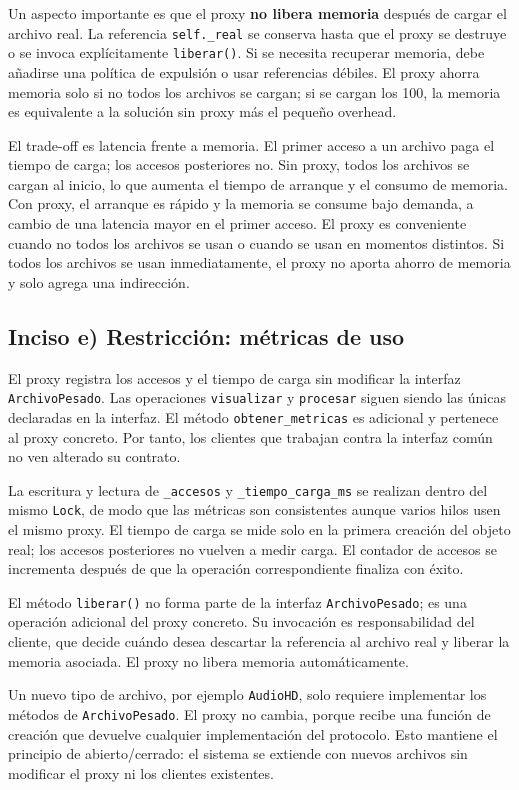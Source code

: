 Un aspecto importante es que el proxy \textbf{no libera memoria} después de cargar el archivo real. La referencia \texttt{self.\_real} se conserva hasta que el proxy se destruye o se invoca explícitamente \texttt{liberar()}. Si se necesita recuperar memoria, debe añadirse una política de expulsión o usar referencias débiles. El proxy ahorra memoria solo si no todos los archivos se cargan; si se cargan los 100, la memoria es equivalente a la solución sin proxy más el pequeño overhead.

El trade-off es latencia frente a memoria. El primer acceso a un archivo paga el tiempo de carga; los accesos posteriores no. Sin proxy, todos los archivos se cargan al inicio, lo que aumenta el tiempo de arranque y el consumo de memoria. Con proxy, el arranque es rápido y la memoria se consume bajo demanda, a cambio de una latencia mayor en el primer acceso. El proxy es conveniente cuando no todos los archivos se usan o cuando se usan en momentos distintos. Si todos los archivos se usan inmediatamente, el proxy no aporta ahorro de memoria y solo agrega una indirección.

\subsection{Inciso e) Restricción: métricas de uso}

El proxy registra los accesos y el tiempo de carga sin modificar la interfaz \texttt{ArchivoPesado}. Las operaciones \texttt{visualizar} y \texttt{procesar} siguen siendo las únicas declaradas en la interfaz. El método \texttt{obtener\_metricas} es adicional y pertenece al proxy concreto. Por tanto, los clientes que trabajan contra la interfaz común no ven alterado su contrato.

La escritura y lectura de \texttt{\_accesos} y \texttt{\_tiempo\_carga\_ms} se realizan dentro del mismo \texttt{Lock}, de modo que las métricas son consistentes aunque varios hilos usen el mismo proxy. El tiempo de carga se mide solo en la primera creación del objeto real; los accesos posteriores no vuelven a medir carga. El contador de accesos se incrementa después de que la operación correspondiente finaliza con éxito.

El método \texttt{liberar()} no forma parte de la interfaz \texttt{ArchivoPesado}; es una operación adicional del proxy concreto. Su invocación es responsabilidad del cliente, que decide cuándo desea descartar la referencia al archivo real y liberar la memoria asociada. El proxy no libera memoria automáticamente.

Un nuevo tipo de archivo, por ejemplo \texttt{AudioHD}, solo requiere implementar los métodos de \texttt{ArchivoPesado}. El proxy no cambia, porque recibe una función de creación que devuelve cualquier implementación del protocolo. Esto mantiene el principio de abierto/cerrado: el sistema se extiende con nuevos archivos sin modificar el proxy ni los clientes existentes.